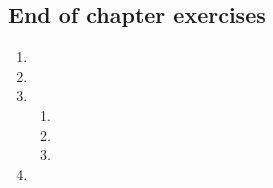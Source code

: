 \subsection{End of chapter exercises} %
  \begin{enumerate}[itemsep=6pt, label=\textbf{\arabic*}.]

  \item %

  \item %

  \item %

    
\begin{enumerate}[noitemsep, label=\textbf{(\alph*)} ]
    \item %
    \item %
    \item %
    \end{enumerate}

  \item %


\end{enumerate}
